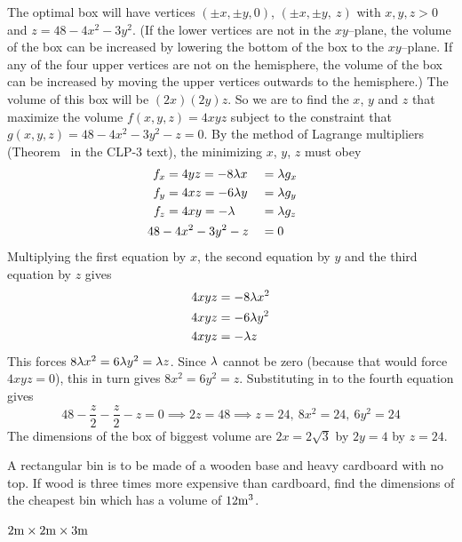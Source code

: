 \begin{solution}
The optimal box will have vertices $(\pm x,\pm y, 0)$,
$(\pm x,\pm y,\ z)$ with $x,y,z>0$ and $z=48-4x^2-3y^2$. (If the lower
vertices are not in the $xy$--plane, the volume of the box can be increased
by lowering the bottom of the box to the $xy$--plane. If any of the four 
upper vertices are not on the hemisphere, the volume of the box can be 
increased by moving the upper vertices outwards to the hemisphere.)  
The volume of this box will be $(2x)(2y)z$. 
So we are to find the $x$, $y$ and $z$ that maximize the volume
$f(x,y,z)=4xyz$ subject to the constraint that 
$g(x,y,z)=48-4x^2-3y^2-z =0$. By the method of
Lagrange multipliers (Theorem~ in the CLP-3 text),
the minimizing $x$, $y$, $z$ must obey
\begin{alignat*}{3}
f_x&=4yz=-8\la x&&=\la g_x\cr
f_y&=4xz=-6\la y&&=\la g_y\cr
f_z&=4xy=-\la&&=\la g_z\cr
&\hskip-0.2in 48-4x^2-3y^2-z&&=0
\end{alignat*}
Multiplying the first equation by $x$, the second equation by $y$ 
and the third equation by $z$  gives
\begin{align*}
4xyz&=-8\lambda x^2 \\
4xyz&=-6\lambda y^2 \\
4xyz&=-\lambda z
\end{align*}
This forces $8\lambda x^2=6\lambda y^2=\lambda z$. Since $\lambda$ cannot be zero (because
that would force $4xyz=0$), this in turn gives $8 x^2=6 y^2= z$. Substituting
in to the fourth equation gives
\begin{equation*}
48 -\frac{z}{2}-\frac{z}{2}-z=0\implies 2z=48\implies z=24,\ 8x^2=24,\
6y^2=24
\end{equation*}
The dimensions of the box of biggest volume are 
$2x=2\sqrt{3}$ by $2y=4$ by $z=24$.
\end{solution}

\begin{question}[M200 2001D] %
A rectangular bin is to be made of a wooden base and
heavy cardboard with no top. If wood is three times more expensive than
cardboard, find the dimensions of the cheapest bin which has a volume
of $12{\rm m}^3$.
\end{question}

%

\begin{answer}
$2{\rm m}\times 2{\rm m}\times 3{\rm m}$
\end{answer}

